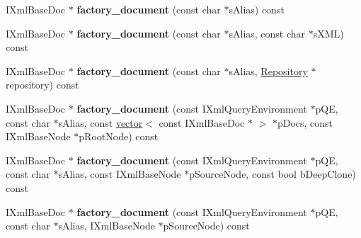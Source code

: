\begin{DoxyCompactItemize}
\item 
\hypertarget{classgeneral__server_1_1LibXmlLibrary_a9dae4912e739a35ac7548a18176bedc4}{\-I\-Xml\-Base\-Doc $\ast$ {\bfseries factory\-\_\-document} (const char $\ast$s\-Alias) const }\label{classgeneral__server_1_1LibXmlLibrary_a9dae4912e739a35ac7548a18176bedc4}

\item 
\hypertarget{classgeneral__server_1_1LibXmlLibrary_a4e218d33438cf9630a036f74b1491912}{\-I\-Xml\-Base\-Doc $\ast$ {\bfseries factory\-\_\-document} (const char $\ast$s\-Alias, const char $\ast$s\-X\-M\-L) const }\label{classgeneral__server_1_1LibXmlLibrary_a4e218d33438cf9630a036f74b1491912}

\item 
\hypertarget{classgeneral__server_1_1LibXmlLibrary_a9e3b27f71ebcf8ba6f6d1e40ae1d2960}{\-I\-Xml\-Base\-Doc $\ast$ {\bfseries factory\-\_\-document} (const char $\ast$s\-Alias, \hyperlink{classgeneral__server_1_1Repository}{\-Repository} $\ast$repository) const }\label{classgeneral__server_1_1LibXmlLibrary_a9e3b27f71ebcf8ba6f6d1e40ae1d2960}

\item 
\hypertarget{classgeneral__server_1_1LibXmlLibrary_ad2015a9572351fb689e1a866ec020270}{\-I\-Xml\-Base\-Doc $\ast$ {\bfseries factory\-\_\-document} (const \-I\-Xml\-Query\-Environment $\ast$p\-Q\-E, const char $\ast$s\-Alias, const \hyperlink{classvector}{vector}$<$ const \-I\-Xml\-Base\-Doc $\ast$ $>$ $\ast$p\-Docs, const \-I\-Xml\-Base\-Node $\ast$p\-Root\-Node) const }\label{classgeneral__server_1_1LibXmlLibrary_ad2015a9572351fb689e1a866ec020270}

\item 
\hypertarget{classgeneral__server_1_1LibXmlLibrary_a57c6c51e2a38e68003c8fb8f5f4d611d}{\-I\-Xml\-Base\-Doc $\ast$ {\bfseries factory\-\_\-document} (const \-I\-Xml\-Query\-Environment $\ast$p\-Q\-E, const char $\ast$s\-Alias, const \-I\-Xml\-Base\-Node $\ast$p\-Source\-Node, const bool b\-Deep\-Clone) const }\label{classgeneral__server_1_1LibXmlLibrary_a57c6c51e2a38e68003c8fb8f5f4d611d}

\item 
\hypertarget{classgeneral__server_1_1LibXmlLibrary_a4cf305a25571890a08ad0d8621165be2}{\-I\-Xml\-Base\-Doc $\ast$ {\bfseries factory\-\_\-document} (const \-I\-Xml\-Query\-Environment $\ast$p\-Q\-E, const char $\ast$s\-Alias, \-I\-Xml\-Base\-Node $\ast$p\-Source\-Node) const }\label{classgeneral__server_1_1LibXmlLibrary_a4cf305a25571890a08ad0d8621165be2}


\end{DoxyCompactItemize}
